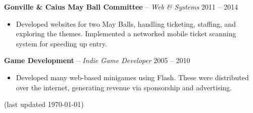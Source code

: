 \documentclass{article}
\begin{document}
\textbf{Gonville \& Caius May Ball Committee} -- \emph{Web \& Systems} \hfill 2011 -- 2014
\\[-6mm]
\begin{itemize}
  \item[]
  Developed websites for two May Balls, handling ticketing, staffing, and exploring the themes. Implemented a networked mobile ticket scanning system for speeding up entry.
\end{itemize} \smallskip

\textbf{Game Development} -- \emph{Indie Game Developer} \hfill 2005 -- 2010 \\[-6mm]
\begin{itemize}
  \item[]
  Developed many web-based minigames using Flash. These were distributed over the
  internet, generating revenue via sponsorship and advertising.
\end{itemize}

\vfill



\centering \small (last updated \today)
\end{document}
